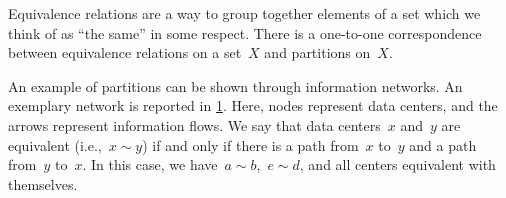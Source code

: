 \begin{remark}
    Equivalence relations are a way to group together elements of a set which we think of as ``the same'' in some respect. There is a one-to-one correspondence between equivalence relations on a set~$X$ and partitions on~$X$.
\end{remark}

\begin{example}
    An example of partitions can be shown through information networks. An exemplary network is reported in \cref{fig:info_network}. Here, nodes represent data centers, and the arrows represent information flows. We say that data centers~$x$ and~$y$ are equivalent (i.e.,~$x\sim y$) if and only if there is a path from~$x$ to~$y$ and a path from~$y$ to~$x$. In this case, we have~$a\sim b$,~$e\sim d$, and all centers equivalent with themselves.
\end{example}

\begin{figure}[h!]
    \begin{center}
    \end{center}
    \caption{\label{fig:info_network}}
\end{figure}
